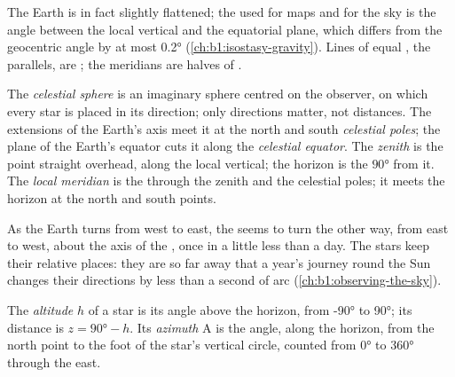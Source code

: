 The Earth is in fact slightly flattened; the  used for maps and for
the sky is the angle between the local vertical and the equatorial plane,
which differs from the geocentric angle by at most \ang{0.2}
(\cref{ch:b1:isostasy-gravity}). Lines of equal , the parallels, are
; the meridians are halves of .

\begin{definition}\label{def:b1:spherical-astronomy:celestial-sphere}
The \emph{celestial sphere} is an imaginary sphere
centred on the observer, on which every star is placed in its direction; only
directions matter, not distances. The extensions of the Earth's axis meet it
at the north and south \emph{celestial poles}; the
plane of the Earth's equator cuts it along the \emph{celestial
equator}. The \emph{zenith} is the
point straight overhead, along the local vertical; the horizon is the  $\ang{90}$ from it. The \emph{local meridian} is
the  through the zenith and the celestial poles; it meets the
horizon at the north and south points.
\end{definition}

As the Earth turns from west to east, the  seems to turn the
other way, from east to west, about the axis of the , once in
a little less than a day. The stars keep their relative places: they are so
far away that a year's journey round the Sun changes their directions by
less than a second of arc (\cref{ch:b1:observing-the-sky}).

\begin{definition}\label{def:b1:spherical-astronomy:horizontal}
The \emph{altitude} $h$ of a star is its angle
above the horizon, from \ang{-90} to \ang{90}; its  distance is
$z = \ang{90} - h$. Its \emph{azimuth} $\mathrm{A}$ is the
angle, along the horizon, from the north point to the foot of the star's
vertical circle, counted from \ang{0} to \ang{360} through the east.
\end{definition}

